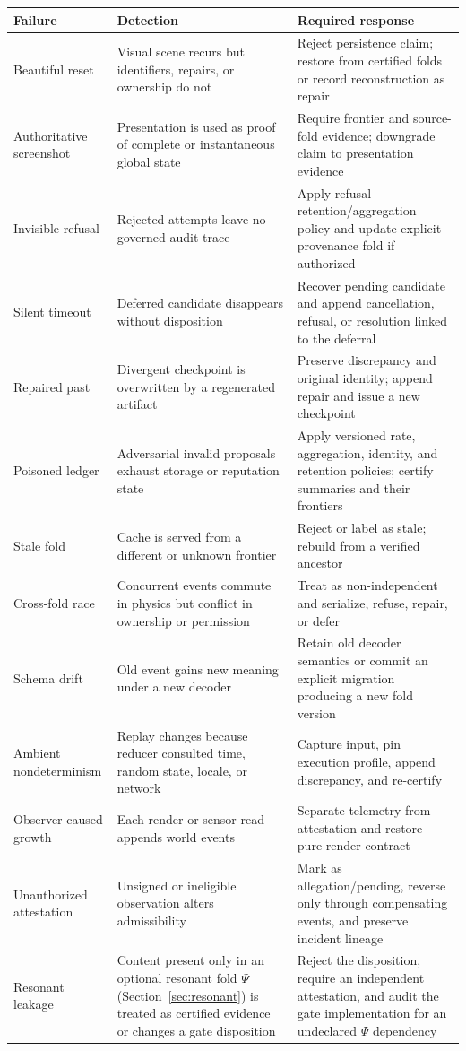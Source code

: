 \documentclass[11pt]{article}
\begin{document}
\begin{longtable}{p{}p{}p{}}
\toprule
Failure & Detection & Required response \\
\midrule
Beautiful reset & Visual scene recurs but identifiers, repairs, or ownership do not & Reject persistence claim; restore from certified folds or record reconstruction as repair \\
Authoritative screenshot & Presentation is used as proof of complete or instantaneous global state & Require frontier and source-fold evidence; downgrade claim to presentation evidence \\
Invisible refusal & Rejected attempts leave no governed audit trace & Apply refusal retention/aggregation policy and update explicit provenance fold if authorized \\
Silent timeout & Deferred candidate disappears without disposition & Recover pending candidate and append cancellation, refusal, or resolution linked to the deferral \\
Repaired past & Divergent checkpoint is overwritten by a regenerated artifact & Preserve discrepancy and original identity; append repair and issue a new checkpoint \\
Poisoned ledger & Adversarial invalid proposals exhaust storage or reputation state & Apply versioned rate, aggregation, identity, and retention policies; certify summaries and their frontiers \\
Stale fold & Cache is served from a different or unknown frontier & Reject or label as stale; rebuild from a verified ancestor \\
Cross-fold race & Concurrent events commute in physics but conflict in ownership or permission & Treat as non-independent and serialize, refuse, repair, or defer \\
Schema drift & Old event gains new meaning under a new decoder & Retain old decoder semantics or commit an explicit migration producing a new fold version \\
Ambient nondeterminism & Replay changes because reducer consulted time, random state, locale, or network & Capture input, pin execution profile, append discrepancy, and re-certify \\
Observer-caused growth & Each render or sensor read appends world events & Separate telemetry from attestation and restore pure-render contract \\
Unauthorized attestation & Unsigned or ineligible observation alters admissibility & Mark as allegation/pending, reverse only through compensating events, and preserve incident lineage \\
Resonant leakage & Content present only in an optional resonant fold $\Psi$ (Section~\ref{sec:resonant}) is treated as certified evidence or changes a gate disposition & Reject the disposition, require an independent attestation, and audit the gate implementation for an undeclared $\Psi$ dependency \\
\bottomrule
\end{longtable}
\end{document}
